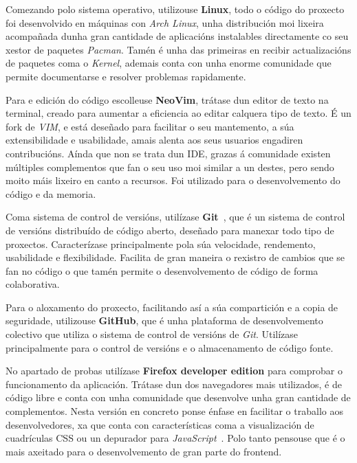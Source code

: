 Comezando polo sistema operativo, utilizouse \textbf{Linux}, todo o código do proxecto foi desenvolvido en máquinas con \textit{Arch Linux}, unha distribución moi lixeira acompañada dunha gran cantidade de aplicacións instalables directamente co seu xestor de paquetes \textit{Pacman}. Tamén é unha das primeiras en recibir actualizacións de paquetes coma o \textit{Kernel}, ademais conta con unha enorme comunidade que permite documentarse e resolver problemas rapidamente.\medbreak

Para e edición do código escolleuse \textbf{NeoVim}, trátase dun editor de texto na terminal, creado para aumentar a eficiencia ao editar calquera tipo de texto. É un fork de \textit{VIM}, e está deseñado para facilitar o seu mantemento, a súa extensibilidade e usabilidade, amais alenta aos seus usuarios engadiren contribucións. Aínda que non se trata dun \acrfull{IDE}, grazas á comunidade existen múltiples complementos que fan o seu uso moi similar a un destes, pero sendo moito máis lixeiro en canto a recursos. Foi utilizado para o desenvolvemento do código e da memoria.\medbreak

Coma sistema de control de versións, utilízase \textbf{Git}~\cite{git}, que é un sistema de control de versións distribuído de código aberto, deseñado para manexar todo tipo de proxectos. Caracterízase principalmente pola súa velocidade, rendemento, usabilidade e flexibilidade. Facilita de gran maneira o rexistro de cambios que se fan no código o que tamén permite o desenvolvemento de código de forma colaborativa.\medbreak

Para o aloxamento do proxecto, facilitando así a súa compartición e a copia de seguridade, utilizouse \textbf{GitHub}, que é unha plataforma de desenvolvemento colectivo que utiliza o sistema de control de versións de \textit{Git}. Utilízase principalmente para o control de versións e o almacenamento de código fonte.\medbreak

No apartado de probas utilízase \textbf{Firefox developer edition} para comprobar o funcionamento da aplicación. Trátase dun dos navegadores mais utilizados, é de código libre e conta con unha comunidade que desenvolve unha gran cantidade de complementos. Nesta versión en concreto ponse énfase en facilitar o traballo aos desenvolvedores, xa que conta con características coma a visualización de cuadrículas \acrshort{CSS} ou un depurador para \textit{JavaScript}~\cite{javascript}. Polo tanto pensouse que é o mais axeitado para o desenvolvemento de gran parte do frontend.\medbreak

